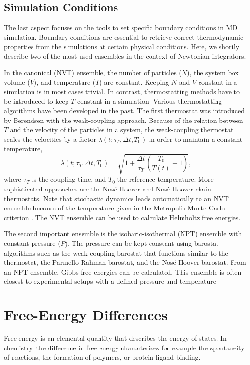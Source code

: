  
\subsection{Simulation Conditions}
The last aspect focuses on the tools to set specific boundary conditions in MD simulation. 
Boundary conditions are essential to retrieve correct thermodynamic properties from the simulations at certain physical conditions. Here, we shortly describe two of the most used ensembles in the context of Newtonian integrators.

In the canonical (NVT) ensemble, the number of particles ($N$), the system box volume ($V$), and temperature ($T$) are constant. Keeping $N$ and $V$ constant in a simulation is in most cases trivial. In contrast, thermostatting methods have to be introduced to keep $T$ constant in a simulation.  Various thermostatting algorithms have been developed in the past. The first thermostat was introduced by Berendsen\cite{Berendsen1984} with the weak-coupling approach. Because of the relation between $T$ and the velocity of the particles in a system, the weak-coupling thermostat scales the velocities by a factor $\lambda(t; \tau_T, \Delta t, T_0)$ in order to maintain a constant temperature,  
\begin{equation}
    \lambda(t; \tau_T, \Delta t, T_0) = \sqrt{1 + \frac{\Delta t}{\tau_{T}} \left( \frac{T_0}{T(t)}-1 \right) },
\end{equation}
where $\tau_{T}$ is the coupling time, and $T_{0}$ the reference temperature.\cite{Berendsen1984}
More sophisticated approaches are the Nos\'e-Hoover\cite{Nose1984, Nose1984A, Hoover1985} and Nos\'e-Hoover chain\cite{Martyna1992} thermostats. Note that stochastic dynamics leads automatically to an NVT ensemble because of the temperature given in the Metropolis-Monte Carlo criterion \cite{Hastings1970}. The NVT ensemble can be used to calculate Helmholtz free energies\cite{Helmholtz1882}.

The second important ensemble is the isobaric-isothermal (NPT) ensemble with constant pressure ($P$). The pressure can be kept constant using barostat algorithms such as the weak-coupling barostat\cite{Berendsen1984} that functions similar to the thermostat, the Parinello-Rahman barostat\cite{Parrinello1981}, and the Nos\'e-Hoover barostat\cite{Nose1983}. From an NPT ensemble, Gibbs free energies can be calculated\cite{Gibbs1879}. This ensemble is often closest to experimental setups with a defined pressure and temperature.

\section{Free-Energy Differences}
Free energy is an elemental quantity that describes the energy of states. In chemistry, the difference in free energy characterizes for example the spontaneity of reactions, the formation of polymers, or protein-ligand binding.\cite{Kollman1993, Armacost2020, Christ2009, Hansen2014, Cournia2020} 

